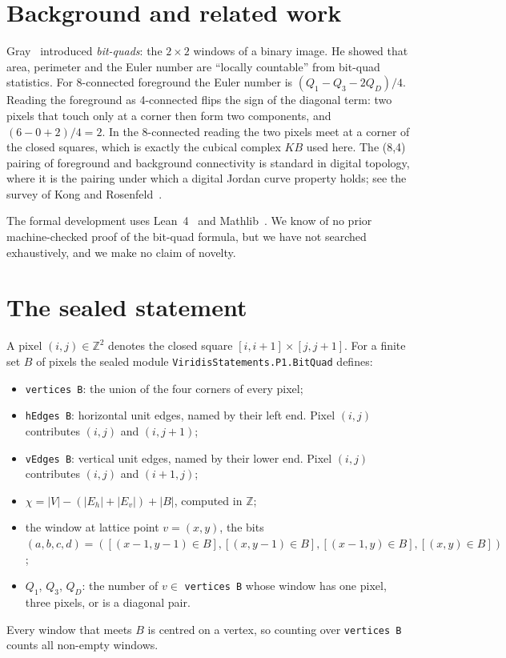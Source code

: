 \documentclass[11pt]{article}
\theoremstyle{definition}
\theoremstyle{remark}
\begin{document}
\section{Background and related work}

Gray~\citep{Gray1971} introduced \emph{bit-quads}: the $2\times2$ windows of a
binary image. He showed that area, perimeter and the Euler number are
``locally countable'' from bit-quad statistics. For 8-connected foreground the
Euler number is $(Q_1 - Q_3 - 2Q_D)/4$. Reading the foreground as 4-connected
flips the sign of the diagonal term: two pixels that touch only at a corner then
form two components, and $(6 - 0 + 2)/4 = 2$. In the 8-connected reading the two pixels meet at a corner of the closed
squares, which is exactly the cubical complex $K B$ used here. The (8,4)
pairing of foreground and background connectivity is standard in digital
topology, where it is the pairing under which a digital Jordan curve property
holds; see the survey of Kong and Rosenfeld~\citep{KongRosenfeld1989}.

The formal development uses Lean~4~\citep{deMouraUllrich2021} and
Mathlib~\citep{Mathlib2020}. We know of no prior machine-checked proof of the
bit-quad formula, but we have not searched exhaustively, and we make no claim
of novelty.

\section{The sealed statement}

A pixel $(i,j)\in\mathbb{Z}^2$ denotes the closed square
$[i,i+1]\times[j,j+1]$. For a finite set $B$ of pixels the sealed module
\texttt{ViridisStatements.P1.BitQuad} defines:
\begin{itemize}
  \item \texttt{vertices B}: the union of the four corners of every pixel;
  \item \texttt{hEdges B}: horizontal unit edges, named by their left end. Pixel
        $(i,j)$ contributes $(i,j)$ and $(i,j+1)$;
  \item \texttt{vEdges B}: vertical unit edges, named by their lower end. Pixel
        $(i,j)$ contributes $(i,j)$ and $(i+1,j)$;
  \item $\chi = |V| - (|E_h| + |E_v|) + |B|$, computed in $\mathbb{Z}$;
  \item the window at lattice point $v=(x,y)$, the bits
        $(a,b,c,d) = ([(x{-}1,y{-}1)\in B], [(x,y{-}1)\in B], [(x{-}1,y)\in B], [(x,y)\in B])$;
  \item $Q_1$, $Q_3$, $Q_D$: the number of $v\in$ \texttt{vertices B} whose window
        has one pixel, three pixels, or is a diagonal pair.
\end{itemize}
Every window that meets $B$ is centred on a vertex, so counting over
\texttt{vertices B} counts all non-empty windows.
\end{document}
